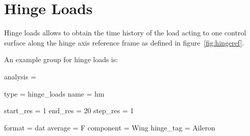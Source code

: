 \section{Hinge Loads}

Hinge loads allows to obtain the time history of the load acting to one control 
surface along the hinge axis reference frame as defined in figure~\ref{fig:hingeref}. 

An example  group for hinge loads is:

\begin{inputfile}
analysis = {
  type = hinge_loads
  name = hm

  start_res = 1
  end_res = 20
  step_res = 1

  format = dat
  average = F
  component = Wing
  hinge_tag = Aileron
}
\end{inputfile}

